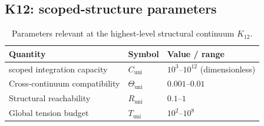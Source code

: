 
\subsection*{K12: scoped-structure parameters}

\begin{table}[h]
  \centering
  \caption{Parameters relevant at the highest-level structural continuum \(K_{12}\).}
  \label{tab:k12-scoped-parameters}
  \begin{tabular}{lll}
    \hline
    Quantity & Symbol & Value / range \\
    \hline
    scoped integration capacity & \(C_\mathrm{uni}\)
        & \(10^3\text{–}10^{12}\) (dimensionless) \\
    Cross-continuum compatibility & \(\Theta_\mathrm{uni}\)
        & \(0.001\text{–}0.01\) \\
    Structural reachability & \(R_\mathrm{uni}\)
        & \(0.1\text{–}1\) \\
    Global tension budget & \(T_\mathrm{uni}\)
        & \(10^2\text{–}10^8\) \\
    \hline
  \end{tabular}
\end{table}
